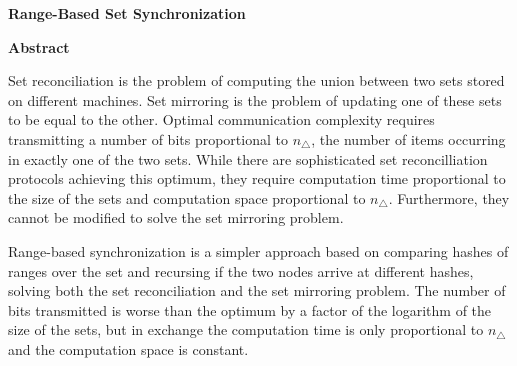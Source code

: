 
\thispagestyle{plain}
\begin{center}
    \Large
    \textbf{Range-Based Set Synchronization}
       
    \vspace{0.9cm}
    \textbf{Abstract}
\end{center}

Set reconciliation is the problem of computing the union between two sets stored on different machines. Set mirroring is the problem of updating one of these sets to be equal to the other. Optimal communication complexity requires transmitting a number of bits proportional to $n_{\triangle}$, the number of items occurring in exactly one of the two sets. While there are sophisticated set reconcilliation protocols achieving this optimum, they require computation time proportional to the size of the sets and computation space proportional to $n_{\triangle}$. Furthermore, they cannot be modified to solve the set mirroring problem.

Range-based synchronization is a simpler approach based on comparing hashes of ranges over the set and recursing if the two nodes arrive at different hashes, solving both the set reconciliation and the set mirroring problem. The number of bits transmitted is worse than the optimum by a factor of the logarithm of the size of the sets, but in exchange the computation time is only proportional to $n_{\triangle}$ and the computation space is constant.